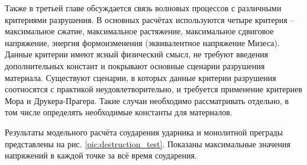 Также в третьей главе обсуждается связь волновых процессов с различными критериями разрушения. В основных расчётах используются четыре критерия -- максимальное сжатие, максимальное растяжение, максимальное сдвиговое напряжение, энергия формоизменения (эквивалентное напряжение Мизеса). Данные критерии имеют ясный физический смысл, не требуют введения дополнительных констант и покрывают основные сценарии разрушения материала. Существуют сценарии, в которых данные критерии разрушения соотносятся с практикой неудовлетворительно, и требуется применение критериев Мора и Друкера-Прагера. Такие случаи необходимо рассматривать отдельно, в том числе определять необходимые константы для материалов.

Результаты модельного расчёта соударения ударника и монолитной преграды представлены на рис. \ref{pic:destruction_test}. Показаны максимальные значения напряжений в каждой точке за всё время соударения.

